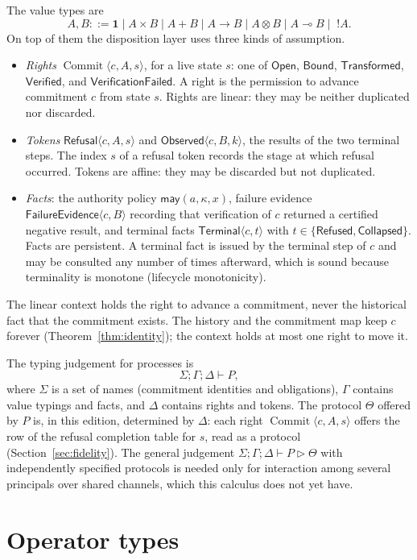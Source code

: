 \documentclass[11pt,openany]{book}
\theoremstyle{remark}
\newcommand{\Commit}{\operatorname{Commit}}
\begin{document}
The value types are
\[
A,B ::= \mathbf 1\mid A\times B\mid A+B\mid A\to B
\mid A\otimes B\mid A\multimap B\mid\;!A .
\]
On top of them the disposition layer uses three kinds of assumption.
\begin{itemize}[leftmargin=1.5em]
\item \emph{Rights} $\Commit\langle c,A,s\rangle$, for a live state $s$:
one of $\mathsf{Open}$, $\mathsf{Bound}$, $\mathsf{Transformed}$,
$\mathsf{Verified}$, and $\mathsf{VerificationFailed}$. A right is the
permission to advance commitment $c$ from state $s$. Rights are linear: they may be neither duplicated nor
discarded.
\item \emph{Tokens} $\mathsf{Refusal}\langle c,A,s\rangle$ and
$\mathsf{Observed}\langle c,B,k\rangle$, the results of the two terminal
steps. The index $s$ of a refusal token records the stage at which refusal
occurred. Tokens are affine: they may be discarded but not duplicated.
\item \emph{Facts}: the authority policy $\mathsf{may}(a,\kappa,x)$,
failure evidence $\mathsf{FailureEvidence}\langle c,B\rangle$ recording
that verification of $c$ returned a certified negative result, and
terminal facts $\mathsf{Terminal}\langle c,t\rangle$ with
$t\in\{\mathsf{Refused},\mathsf{Collapsed}\}$. Facts are persistent. A
terminal fact is issued by the terminal step of $c$ and may be consulted
any number of times afterward, which is sound because terminality is
monotone (lifecycle monotonicity).
\end{itemize}
The linear context holds the right to advance a commitment, never the
historical fact that the commitment exists. The history and the
commitment map keep $c$ forever (Theorem~\ref{thm:identity}); the context
holds at most one right to move it.

The typing judgement for processes is
\[
\Sigma;\Gamma;\Delta\vdash P ,
\]
where $\Sigma$ is a set of names (commitment identities and obligations),
$\Gamma$ contains value typings and facts, and $\Delta$ contains rights and
tokens. The protocol $\Theta$ offered by $P$ is, in this edition,
determined by $\Delta$: each right $\Commit\langle c,A,s\rangle$ offers
the row of the refusal completion table for $s$, read as a protocol
(Section~\ref{sec:fidelity}). The general judgement
$\Sigma;\Gamma;\Delta\vdash P\triangleright\Theta$ with independently
specified protocols is needed only for interaction among several
principals over shared channels, which this calculus does not yet have.

\section{Operator types}
\end{document}
